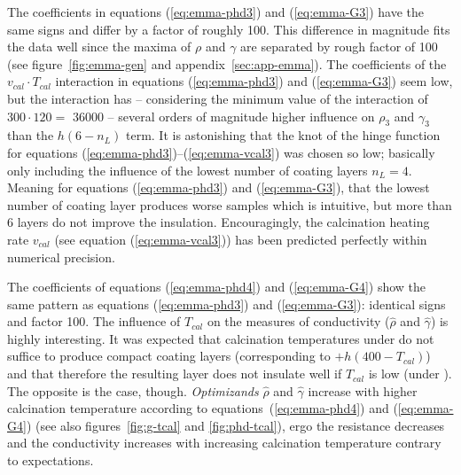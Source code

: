The coefficients in equations (\ref{eq:emma-phd3}) and (\ref{eq:emma-G3}) have the same signs and differ by a factor of roughly 100.
This difference in magnitude fits the data well since the maxima of $\rho$ and $\gamma$ are separated by rough factor of 100 (see figure~\ref{fig:emma-gen} and appendix~\ref{sec:app-emma}). %
The coefficients of the $v_{cal} \cdot T_{cal}$ interaction in equations (\ref{eq:emma-phd3}) and (\ref{eq:emma-G3}) 
seem low, but the interaction has -- considering the minimum value of the interaction of $300 \cdot 120 =$  \num{36000} -- several orders of magnitude higher influence on $\rho_3$ and $\gamma_3$ than the $h(6-n_L)$ term. 
It is astonishing that the knot of the hinge function for equations (\ref{eq:emma-phd3})--(\ref{eq:emma-vcal3}) was chosen so low; 
basically only including the influence of the lowest number of coating layers $n_L=4$.
Meaning for equations (\ref{eq:emma-phd3}) and (\ref{eq:emma-G3}), that the lowest number of coating layer produces worse samples which is intuitive, but more than 6 layers do not improve the insulation. 
Encouragingly, the calcination heating rate $v_{cal}$ (see equation (\ref{eq:emma-vcal3})) has been predicted perfectly within numerical precision. 

The coefficients of equations (\ref{eq:emma-phd4}) and (\ref{eq:emma-G4}) show the same pattern 
as equations (\ref{eq:emma-phd3}) and (\ref{eq:emma-G3}): identical signs and factor 100. 
%
The influence of $T_{cal}$ on the measures of conductivity ($\hat\rho$ and $\hat\gamma$) is highly interesting. 
It was expected that 
calcination temperatures under  do not suffice to produce compact coating layers (corresponding to $+h(400-T_{cal})$)
and 
that therefore the resulting layer does not insulate well if $T_{cal}$ is low (under ). 
The opposite is the case, though. %
\textit{Optimizands} $\hat\rho$ and $\hat{\gamma}$ increase with higher calcination temperature 
according to equations~(\ref{eq:emma-phd4}) and (\ref{eq:emma-G4}) (see also figures~\ref{fig:g-tcal} and \ref{fig:phd-tcal}), 
ergo the resistance decreases and the conductivity increases with increasing calcination temperature contrary to expectations.

